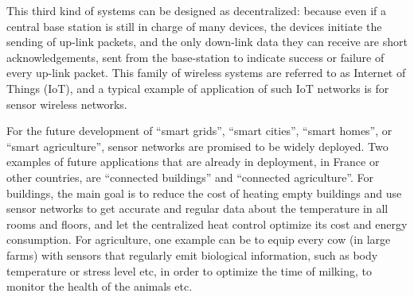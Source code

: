 %
%
This third kind of systems can be designed as decentralized:
because even if a central base station is still in charge of many devices,
the devices initiate the sending of up-link packets, and the only down-link data they can receive are short acknowledgements, sent from the base-station to indicate success or failure of every up-link packet.
This family of wireless systems are referred to as Internet of Things (IoT),
and a typical example of application of such IoT networks is for sensor wireless networks.

For the future development of ``smart grids'', ``smart cities'', ``smart homes'', or ``smart agriculture'', sensor networks are promised to be widely deployed.
Two examples of future applications that are already in deployment, in France or other countries, are ``connected buildings'' and ``connected agriculture''.
For buildings, the main goal is to reduce the cost of heating empty buildings and use sensor networks to get accurate and regular data about the temperature in all rooms and floors, and let the centralized heat control optimize its cost and energy consumption.
For agriculture, one example can be to equip every cow (in large farms) with sensors that regularly emit biological information, such as body temperature or stress level etc, in order to optimize the time of milking, to monitor the health of the animals etc.
%

